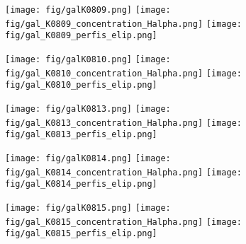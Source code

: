 \begin{figure}[!ht]
\begin{center}
\setcaptionmargin{1cm}
\texttt{[image: fig/galK0809.png]}
\texttt{[image: fig/gal\_K0809\_concentration\_Halpha.png]}
\texttt{[image: fig/gal\_K0809\_perfis\_elip.png]}
\end{center}
\end{figure}


\begin{figure}[!ht]
\begin{center}
\setcaptionmargin{1cm}
\texttt{[image: fig/galK0810.png]}
\texttt{[image: fig/gal\_K0810\_concentration\_Halpha.png]}
\texttt{[image: fig/gal\_K0810\_perfis\_elip.png]}
\end{center}
\end{figure}


\begin{figure}[!ht]
\begin{center}
\setcaptionmargin{1cm}
\texttt{[image: fig/galK0813.png]}
\texttt{[image: fig/gal\_K0813\_concentration\_Halpha.png]}
\texttt{[image: fig/gal\_K0813\_perfis\_elip.png]}
\end{center}
\end{figure}


\begin{figure}[!ht]
\begin{center}
\setcaptionmargin{1cm}
\texttt{[image: fig/galK0814.png]}
\texttt{[image: fig/gal\_K0814\_concentration\_Halpha.png]}
\texttt{[image: fig/gal\_K0814\_perfis\_elip.png]}
\end{center}
\end{figure}


\begin{figure}[!ht]
\begin{center}
\setcaptionmargin{1cm}
\texttt{[image: fig/galK0815.png]}
\texttt{[image: fig/gal\_K0815\_concentration\_Halpha.png]}
\texttt{[image: fig/gal\_K0815\_perfis\_elip.png]}
\end{center}
\end{figure}


